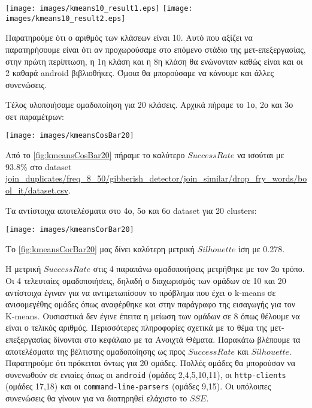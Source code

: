 \noindent\begin{minipage}{\linewidth}
    \centering
    \texttt{[image: images/kmeans10\_result1.eps]}
    \texttt{[image: images/kmeans10\_result2.eps]}
    \label{fig:kmeans10_result}
\end{minipage}

Παρατηρούμε ότι ο αριθμός των κλάσεων είναι 10. Αυτό που αξίζει να παρατηρήσουμε είναι ότι αν προχωρούσαμε στο επόμενο στάδιο της μετ-επεξεργασίας, στην πρώτη περίπτωση, η 1η κλάση και η 8η κλάση θα ενώνονταν καθώς είναι και οι 2 καθαρά android βιβλιοθήκες. Όμοια θα μπορούσαμε να κάνουμε και άλλες συνενώσεις.

Τέλος υλοποιήσαμε ομαδοποίηση για 20 κλάσεις. Αρχικά πήραμε το 1ο, 2ο και 3ο σετ παραμέτρων:

\noindent\begin{minipage}{\linewidth}
    \centering
    \texttt{[image: images/kmeansCosBar20]}
    \label{fig:kmeansCosBar20}
\end{minipage}

Από το 
\hyperref[fig:kmeansCosBar20]{\figurename{} \ref{fig:kmeansCosBar20}}
πήραμε το καλύτερο $Success Rate$ να ισούται με 93.8\% στο dataset \url{join_duplicates/freq_8_50/gibberish_detector/join_similar/drop_fry_words/bool_it/dataset.csv}.

Τα αντίστοιχα αποτελέσματα στο 4ο, 5ο και 6ο dataset για 20 clusters:

\noindent\begin{minipage}{\linewidth}
    \centering
    \texttt{[image: images/kmeansCorBar20]}
    \label{fig:kmeansCorBar20}
\end{minipage}

Το 
\hyperref[fig:kmeansCorBar20]{\figurename{} \ref{fig:kmeansCorBar20}}
μας δίνει καλύτερη μετρική $Silhouette$ ίση με 0.278.

Η μετρική $Success Rate$ στις 4 παραπάνω ομαδοποιήσεις μετρήθηκε με τον 2ο τρόπο.
Οι 4 τελευταίες ομαδοποιήσεις, δηλαδή ο διαχωρισμός των ομάδων σε 10 και 20 αντίστοιχα έγιναν για να αντιμετωπίσουν το πρόβλημα που έχει ο k-means σε ανισομεγέθης ομάδες όπως αναφέρθηκε και στην παράγραφο της εισαγωγής για τον K-means. Ουσιαστικά δεν έγινε έπειτα η μείωση των ομάδων σε 8 όπως θέλουμε να είναι ο τελικός αριθμός. Περισσότερες πληροφορίες σχετικά με το θέμα της μετ-επεξεργασίας δίνονται στο κεφάλαιο με τα Ανοιχτά Θέματα.
Παρακάτω βλέπουμε τα αποτελέσματα της βέλτιστης ομαδοποίησης ως προς $Success Rate$ και $Silhouette$. Παρατηρούμε ότι πρόκειται όντως για 20 ομάδες. Πολλές ομάδες θα μπορούσαν να συνενωθούν σε ενιαίες όπως οι \texttt{android} (ομάδες 2,4,5,10,11), οι \texttt{http-clients} (ομάδες 17,18) και οι \texttt{command-line-parsers} (ομάδες 9,15). Οι υπόλοιπες συνενώσεις θα γίνουν για να διατηρηθεί ελάχιστο το $SSE$.

